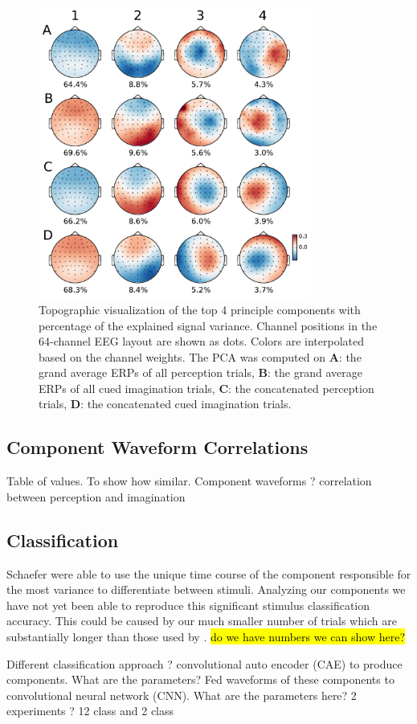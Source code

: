 \begin{figure}[t] 
  \begin{center}
    \includegraphics[width=0.8\textwidth,keepaspectratio=true]{Figures/principle_components.pdf}
    \caption{%
Topographic visualization of the top 4 principle components with percentage of the explained signal variance. %
Channel positions in the 64-channel EEG layout are shown as dots.
Colors are interpolated based on the channel weights.
The PCA was computed on
\textbf{A}: the grand average \acp{ERP} of all perception trials,
\textbf{B}: the grand average \acp{ERP} of all cued imagination trials,
\textbf{C}: the concatenated perception trials,
\textbf{D}: the concatenated cued imagination trials.
}
    \label{fig:components}
  \end{center}
\end{figure}

\subsection*{Component Waveform Correlations}
Table of values.
To show how similar.
Component waveforms ? correlation between perception and imagination 

\subsection*{Classification}
Schaefer \etal \cite{schaefer_name_2011} were able to use the unique time course of the component responsible for the most variance to differentiate between stimuli.
Analyzing our components we have not yet been able to reproduce this significant stimulus classification accuracy. 
This could be caused by our much smaller number of trials which are substantially longer than those used by \cite{schaefer_name_2011}. 
\hl{do we have numbers we can show here?}

Different classification approach ? convolutional auto encoder (CAE) to produce components. What are the parameters?
Fed waveforms of these components to convolutional neural network (CNN). What are the parameters here? 2 experiments ? 12 class and 2 class